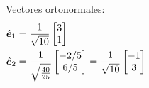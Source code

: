 \documentclass[9pt, aspectratio=169]{beamer}
\begin{document}
\begin{frame}
\begin{columns}[c]
        Vectores ortonormales:
        \begin{align*}
            \hat{\bm{e}}_1 &= \frac{1}{\sqrt{10}} \begin{bmatrix} 3 \\ 1 \end{bmatrix} \\
            \hat{\bm{e}}_2  &= \frac{1}{\sqrt{\frac{40}{25}}} \begin{bmatrix} -2/5 \\ 6/5 \end{bmatrix} = \frac{1}{\sqrt{10}} \begin{bmatrix} -1 \\ 3 \end{bmatrix}
        \end{align*}    
    \end{columns}
\end{frame}
\end{document}
